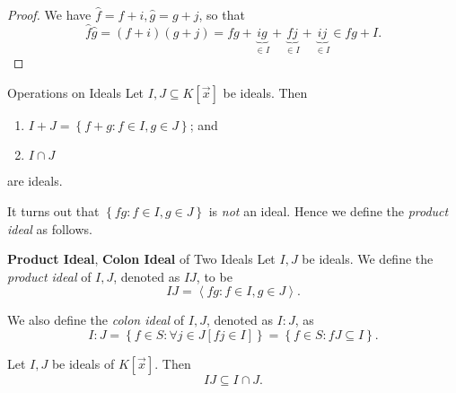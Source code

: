 \documentclass[co439]{subfiles}
\begin{document}
    \begin{proof}
        We have $\hat{f}=f+i, \hat{g}=g+j$, so that
        \begin{equation*}
            \hat{f}\hat{g} = \left( f+i \right)\left( g+j \right) = fg+\underbrace{ig}_{\in I}+\underbrace{fj}_{\in I}+\underbrace{ij}_{\in I} \in fg+I.
        \end{equation*}
    \end{proof}
    
    \begin{prop}{Operations on Ideals}
        Let $I,J\subseteq K\left[ \vec{x} \right]$ be ideals. Then
        \begin{enumerate}
            \item $I+J = \left\lbrace f+g:f\in I, g\in J \right\rbrace$; and
            \item $I\cap J$
        \end{enumerate}
        are ideals.
    \end{prop}

    \rruleline

    \np It turns out that $\left\lbrace fg:f\in I, g\in J \right\rbrace$ is \textit{not} an ideal. Hence we define the \textit{product ideal} as follows.

    \begin{definition}{\textbf{Product Ideal}, \textbf{Colon Ideal} of Two Ideals}
        Let $I,J$ be ideals. We define the \emph{product ideal} of $I,J$, denoted as $IJ$, to be
        \begin{equation*}
            IJ = \left< fg: f\in I, g\in J \right> .
        \end{equation*}

        We also define the \emph{colon ideal} of $I,J$, denoted as $I:J$, as
        \begin{equation*}
            I:J = \left\lbrace f\in S: \forall j\in J\left[ fj\in I \right] \right\rbrace = \left\lbrace f\in S: fJ\subseteq I \right\rbrace.
        \end{equation*}
    \end{definition}
    
    \begin{prop}{}
        Let $I,J$ be ideals of $K\left[ \vec{x} \right]$. Then
        \begin{equation*}
            IJ \subseteq I\cap J.
        \end{equation*}
    \end{prop}
    
\end{document}
